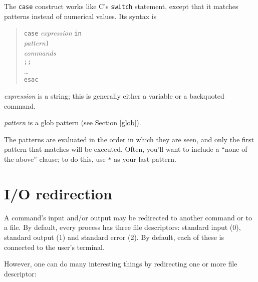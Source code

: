 \documentclass{article}
\newcommand{\code}[1]{\texttt{#1}}
\begin{document}
	\label{case}
	The \code{case} construct works like C's \code{switch}
statement, except that it matches patterns instead of numerical
values. Its syntax is
\begin{quote}
\begin{tabbing}
\code{case} \= \textit{expression} \code{in}\\
	\> \textit{pattern}\code{)} \= \\
		\>\> \textit{commands}\\
		\>\> \code{;;}\\
	\> \ldots\\
\code{esac}
\end{tabbing}
\end{quote}

	\textit{expression} is a string; this is generally either a
variable or a backquoted command.

	\textit{pattern} is a glob pattern (see Section
\ref{glob}).

	The patterns are evaluated in the order in which they are
seen, and only the first pattern that matches will be executed. Often,
you'll want to include a ``none of the above'' clause; to do this, use
\code{*} as your last pattern.

\section{I/O redirection}

	\label{io-redirection} A command's input and/or output may be
redirected to another command or to a file. By default, every process
has three file descriptors: standard input (0), standard output (1)
and standard error (2). By default, each of these is connected to the
user's terminal.

	However, one can do many interesting things by redirecting one
or more file descriptor:
\end{document}
